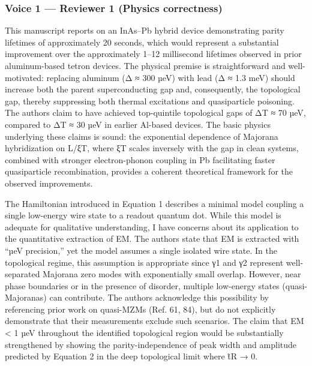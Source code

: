 \documentclass[10pt,letterpaper]{article}
\begin{document}
\hypertarget{voice-1-reviewer-1-physics-correctness}{%
\subsubsection{Voice 1 --- Reviewer 1 (Physics correctness)}\label{voice-1-reviewer-1-physics-correctness}}

This manuscript reports on an InAs--Pb hybrid device demonstrating parity lifetimes of approximately 20 seconds, which would represent a substantial improvement over the approximately 1--12 millisecond lifetimes observed in prior aluminum-based tetron devices. The physical premise is straightforward and well-motivated: replacing aluminum (Δ ≈ 300 µeV) with lead (Δ ≈ 1.3 meV) should increase both the parent superconducting gap and, consequently, the topological gap, thereby suppressing both thermal excitations and quasiparticle poisoning. The authors claim to have achieved top-quintile topological gaps of ΔT ≈ 70 µeV, compared to ΔT ≈ 30 µeV in earlier Al-based devices. The basic physics underlying these claims is sound: the exponential dependence of Majorana hybridization on L/ξT, where ξT scales inversely with the gap in clean systems, combined with stronger electron-phonon coupling in Pb facilitating faster quasiparticle recombination, provides a coherent theoretical framework for the observed improvements.

The Hamiltonian introduced in Equation 1 describes a minimal model coupling a single low-energy wire state to a readout quantum dot. While this model is adequate for qualitative understanding, I have concerns about its application to the quantitative extraction of EM. The authors state that EM is extracted with ``µeV precision,'' yet the model assumes a single isolated wire state. In the topological regime, this assumption is appropriate since γ1 and γ2 represent well-separated Majorana zero modes with exponentially small overlap. However, near phase boundaries or in the presence of disorder, multiple low-energy states (quasi-Majoranas) can contribute. The authors acknowledge this possibility by referencing prior work on quasi-MZMs (Ref. 61, 84), but do not explicitly demonstrate that their measurements exclude such scenarios. The claim that EM \textless{} 1 µeV throughout the identified topological region would be substantially strengthened by showing the parity-independence of peak width and amplitude predicted by Equation 2 in the deep topological limit where t̃R → 0.
\end{document}
